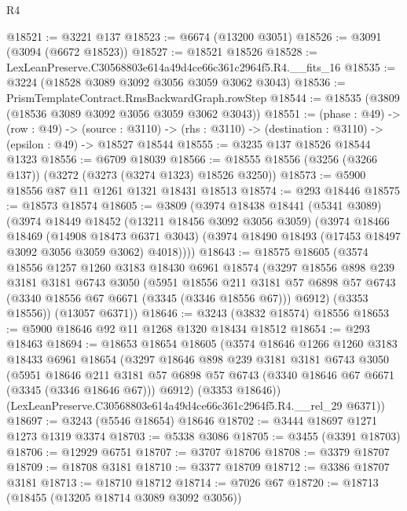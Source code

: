 \begin{lexlean}{R4}
\begin{coremodule}
@18521 := @3221 @137
@18523 := @6674 (@13200 @3051)
@18526 := @3091 (@3094 (@6672 @18523))
@18527 := @18521 @18526
@18528 := LexLeanPreserve.C30568803e614a49d4ce66c361c2964f5.R4.__fits_16
@18535 := @3224 (@18528 @3089 @3092 @3056 @3059 @3062 @3043)
@18536 := PrismTemplateContract.RmsBackwardGraph.rowStep
@18544 := @18535 (@3809 (@18536 @3089 @3092 @3056 @3059 @3062 @3043))
@18551 := (phase : @49) ->
  (row : @49) ->
  (source : @3110) -> (rhs : @3110) -> (destination : @3110) -> (epsilon : @49) -> @18527 @18544
@18555 := @3235 @137 @18526 @18544 @1323
@18556 := @6709 @18039
@18566 := @18555 @18556 (@3256 (@3266 @137)) (@3272 (@3273 (@3274 @1323) @18526 @3250))
@18573 := @5900 @18556 @87 @11 @1261 @1321 @18431 @18513
@18574 := @293 @18446
@18575 := @18573 @18574
@18605 := @3809
    (@3974
      @18438
      @18441
      (@5341 @3089)
      (@3974
        @18449
        @18452
        (@13211 @18456 @3092 @3056 @3059)
        (@3974
          @18466
          @18469
          (@14908 @18473 @6371 @3043)
          (@3974 @18490 @18493 (@17453 @18497 @3092 @3056 @3059 @3062) @4018))))
@18643 := @18575
    @18605
    (@3574
      @18556
      @1257
      @1260
      @3183
      @18430
      @6961
      @18574
      (@3297
        @18556
        @898
        @239
        @3181
        @3181
        @6743
        @3050
        (@5951
          @18556
          @211
          @3181
          @57
          @6898
          @57
          @6743
          (@3340 @18556 @67 @6671 (@3345 (@3346 @18556 @67)))
          @6912)
        (@3353 @18556))
      (@13057 @6371))
@18646 := @3243 (@3832 @18574) @18556
@18653 := @5900 @18646 @92 @11 @1268 @1320 @18434 @18512
@18654 := @293 @18463
@18694 := @18653
    @18654
    @18605
    (@3574
      @18646
      @1266
      @1260
      @3183
      @18433
      @6961
      @18654
      (@3297
        @18646
        @898
        @239
        @3181
        @3181
        @6743
        @3050
        (@5951
          @18646
          @211
          @3181
          @57
          @6898
          @57
          @6743
          (@3340 @18646 @67 @6671 (@3345 (@3346 @18646 @67)))
          @6912)
        (@3353 @18646))
      (LexLeanPreserve.C30568803e614a49d4ce66c361c2964f5.R4.__rel_29 @6371))
@18697 := @3243 (@5546 @18654) @18646
@18702 := @3444 @18697 @1271 @1273 @1319 @3374
@18703 := @5338 @3086
@18705 := @3455 (@3391 @18703)
@18706 := @12929 @6751
@18707 := @3707 @18706
@18708 := @3379 @18707
@18709 := @18708 @3181
@18710 := @3377 @18709
@18712 := @3386 @18707 @3181
@18713 := @18710 @18712
@18714 := @7026 @67
@18720 := @18713 (@18455 (@13205 @18714 @3089 @3092 @3056))

\end{coremodule}
\end{lexlean}
